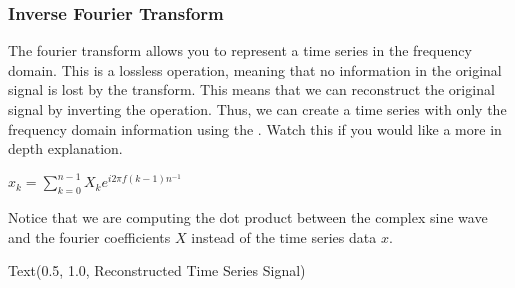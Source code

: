 \documentclass[letterpaper,10pt,english]{sphinxmanual}
\begin{document}
\subsubsection{Inverse Fourier Transform}
\label{\detokenize{content/Signal_Processing:inverse-fourier-transform}}
The fourier transform allows you to represent a time series in the frequency domain. This is a lossless operation, meaning that no information in the original signal is lost by the transform. This means that we can reconstruct the original signal by inverting the operation. Thus, we can create a time series with only the frequency domain information using the . Watch this  if you would like a more in depth explanation.

\(x_k = \sum\limits_{k=0}^{n-1} X_k e^{i2\pi f(k-1)n^{-1}}\)

Notice that we are computing the dot product between the complex sine wave and the fourier coefficients \(X\) instead of the time series data \(x\).

\begin{sphinxVerbatim}[commandchars=\\\{\}]
 
 
 
 
\end{sphinxVerbatim}

\begin{sphinxVerbatim}[commandchars=\\\{\}]
Text(0.5, 1.0, \PYGZsq{}Reconstructed Time Series Signal\PYGZsq{})
\end{sphinxVerbatim}

\noindent{}
\end{document}
